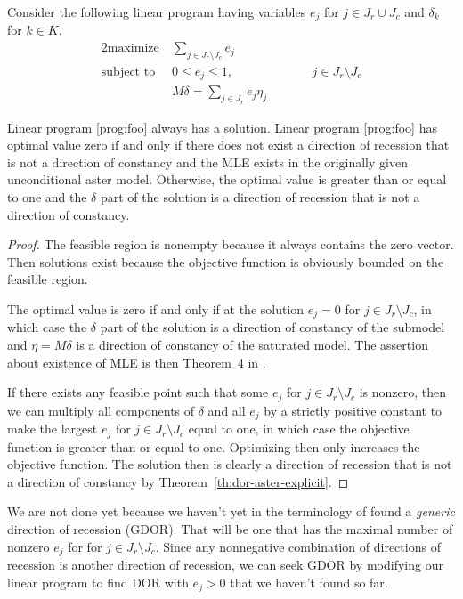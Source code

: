 Consider the following linear program having variables $e_j$
for $j \in J_r \cup J_c$ and $\delta_k$ for $k \in K$.
\begin{alignat}{2}
  \text{maximize}   & \ \sum_{j \in J_r \setminus J_c} e_j
  \nonumber
  \\
  \text{subject to} & \ 0 \le e_j \le 1, & \qquad & j \in J_r \setminus J_c
  \label{prog:foo}
  \\
                    & \ M \delta =
  \sum_{j \in J_r} e_j \eta_j
  \nonumber
\end{alignat}
\begin{theorem} \label{th:lin-prog-one}
Linear program \eqref{prog:foo} always has a solution.
Linear program \eqref{prog:foo} has optimal value zero if and only if
there does
not exist a direction of recession that is not a direction of constancy
and the MLE exists in the originally given unconditional aster model.
Otherwise, the optimal value is greater than or equal to one and the
$\delta$ part of the solution is a direction of recession that is not
a direction of constancy.
\end{theorem}
\begin{proof}
The feasible region is nonempty because it always contains the zero vector.
Then solutions exist because the objective function is obviously bounded
on the feasible region.

The optimal value is zero if and only if at the solution $e_j = 0$ for
$j \in J_r \setminus J_c$, in which case the $\delta$ part of the solution
is a direction of constancy of the submodel and $\eta = M \delta$ is a
direction of constancy of the saturated model.  The assertion about
existence of MLE is then Theorem~{4} in \citet{geyer-gdor}.

If there exists any feasible point such that some $e_j$
for $j \in J_r \setminus J_c$ is nonzero, then we can multiply all components
of $\delta$ and all $e_j$ by a strictly positive constant to make
the largest $e_j$ for $j \in J_r \setminus J_c$ equal to one, in which case
the objective function is greater than or equal to one.
Optimizing then only increases the objective function.
The solution then is clearly a direction of recession that is not a
direction of constancy by Theorem~\ref{th:dor-aster-explicit}.
\end{proof}

We are not done yet because we haven't yet in the terminology of
\citet{geyer-gdor} found a \emph{generic} direction of recession (GDOR).
That will be one that has the maximal number of nonzero $e_j$ for
for $j \in J_r \setminus J_c$.  Since any nonnegative combination of
directions of recession is another direction of recession, we can
seek GDOR by modifying our linear program to find DOR with $e_j > 0$
that we haven't found so far.

